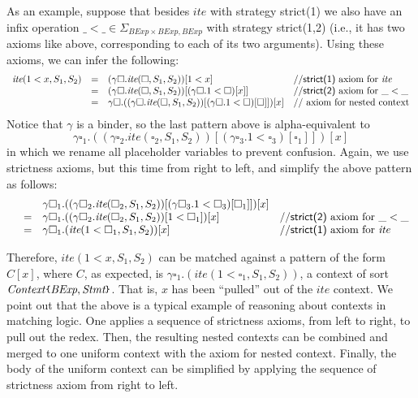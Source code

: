 \documentclass[acmsmall,review,anonymous]{acmart}
\newcommand{\doubleslash}{//\xspace}
\newcommand{\hole}{\square}
\newcommand{\AExp}{\textit{BExp}}
\newcommand{\BExp}{\textit{BExp}}
\newcommand{\Stmt}{\textit{Stmt}}
\newcommand{\ite}{\textit{ite}}
\newcommand{\parametric}[2]{{#1}\raisebox{.2ex}{\texttt{\footnotesize{\{}}}#2\raisebox{.2ex}{\texttt{\footnotesize{\}}}}}
\newcommand{\Context}{\mathit{Context}}
\newcommand{\strict}[1]{\textsf{strict(#1)}}
\begin{document}
As an example, suppose that besides $\ite$ with strategy \textsf{strict(1)}
we also have an infix operation $\_<\_\in\Sigma_{\AExp\times\AExp,\BExp}$ with
strategy \textsf{strict(1,2)}
(i.e., it has two axioms like above, corresponding to each of its two
arguments).
Using these axioms, we can infer the following:
$$
\begin{array}{rcll}
\ite(1 < x,S_1,S_2) & = &
(\gamma \hole . \ite(\hole, S_1, S_2))[1 < x]
& \textrm{\doubleslash \strict{1} axiom for $\ite$}
\\
& = &
(\gamma \hole . \ite(\hole, S_1, S_2))[
(\gamma \hole . 1 < \hole)[x]
]
& \textrm{\doubleslash \strict{2} axiom for $\_<\_$}
\\
& = &
\gamma \hole . ((\gamma \hole . \ite(\hole, S_1, S_2))[
(\gamma \hole . 1 < \hole)[\hole]
])[x]
& \textrm{\doubleslash axiom for nested context}
\end{array}
$$
Notice that $\gamma$ is a binder,
so the last pattern above is alpha-equivalent to
$$
\gamma \hole_1 . ((\gamma \hole_2 . \ite(\hole_2, S_1, S_2))[
(\gamma \hole_3 . 1 < \hole_3)[\hole_1]
])[x]
$$
in which we rename all placeholder variables to prevent confusion.
Again, we use strictness axioms, but this time from right to left,
and simplify the above pattern as follows:
$$
\begin{array}{rcll}
& &
\gamma \hole_1 . ((\gamma \hole_2 . \ite(\hole_2, S_1, S_2))[
(\gamma \hole_3 . 1 < \hole_3)[\hole_1]
])[x]
\\
& = &
\gamma \hole_1 . ((\gamma \hole_2 . \ite(\hole_2, S_1, S_2))[
1 < \hole_1
])[x]
& \textrm{\doubleslash \strict{2} axiom for $\_<\_$}
\\
& = &
\gamma \hole_1 . (\ite(1 < \hole_1, S_1, S_2))[x]
& \textrm{\doubleslash \strict{1} axiom for \ite}
\end{array}
$$

Therefore, $\ite(1 < x,S_1,S_2)$ can be matched against a pattern
of the form $C[x]$, where $C$,
as expected, is $\gamma \hole_1 . (\ite(1 < \hole_1, S_1, S_2))$,
a context of sort $\parametric{\Context}{\AExp,\Stmt}$.
That is, $x$ has been ``pulled'' out of the $\ite$ context.
We point out that the above is a typical example of reasoning
about contexts in matching logic.
One applies a sequence of strictness axioms, from left to right,
to pull out the redex.
Then, the resulting nested contexts can be combined and merged
to one uniform context with the axiom for nested context.
Finally, the body of the uniform context can be simplified
by applying the sequence of strictness axiom from right to left.
\end{document}
